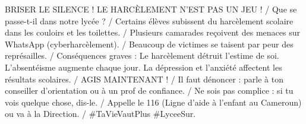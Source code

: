 \documentclass[11pt]{article}
\begin{document}
\begin{definition}
BRISER LE SILENCE ! LE HARCÈLEMENT N'EST PAS UN JEU ! / Que se passe-t-il dans notre lycée ? / Certains élèves subissent du harcèlement scolaire dans les couloirs et les toilettes. / Plusieurs camarades reçoivent des menaces sur WhatsApp (cyberharcèlement). / Beaucoup de victimes se taisent par peur des représailles. / Conséquences graves : Le harcèlement détruit l'estime de soi. L'absentéisme augmente chaque jour. La dépression et l'anxiété affectent les résultats scolaires. / AGIS MAINTENANT ! / Il faut dénoncer : parle à ton conseiller d'orientation ou à un prof de confiance. / Ne sois pas complice : si tu vois quelque chose, dis-le. / Appelle le 116 (Ligne d'aide à l'enfant au Cameroun) ou va à la Direction. / \#TaVieVautPlus \#LyceeSur.
\end{definition}
\end{document}
